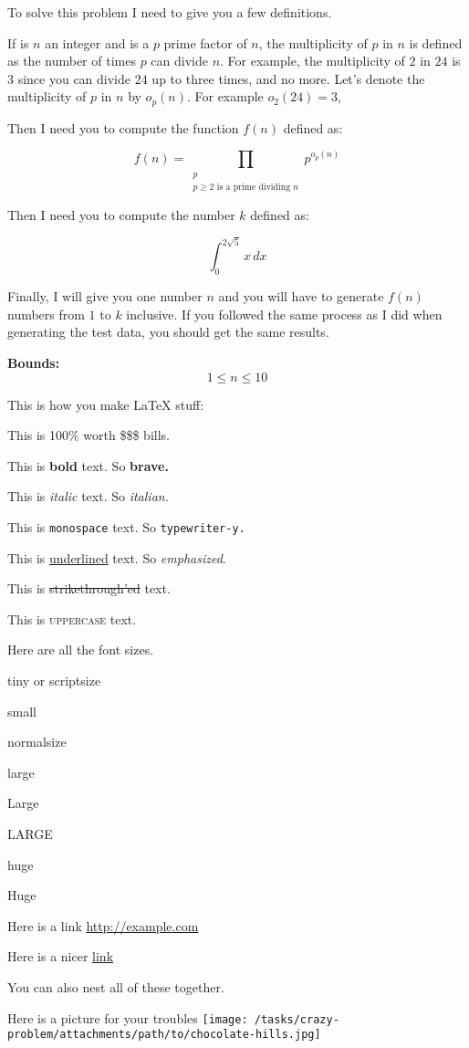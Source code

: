 To solve this problem I need to give you a few definitions.

If is \(n\) an integer and is a \(p\) prime factor of \(n\), the multiplicity of \(p\) in \(n\) is defined as the number of times \(p\) can divide \(n\). For example, the multiplicity of $2$ in $24$ is $3$ since you can divide $24$ up to three times, and no more. Let's denote the multiplicity of $p$ in $n$ by $o_p(n)$. For example \(o_2(24) = 3\), 

Then I need you to compute the function $f(n)$ defined as:

$$f(n) = \prod_{\substack{p \\ p \geq 2 \text{ is a prime dividing } n}} p^{o_p(n)}$$

Then I need you to compute the number $k$ defined as:

\[\int_{0}^{2\sqrt{5}} x \, dx\]

Finally, I will give you one number $n$ and you will have to generate $f(n)$ numbers from $1$ to $k$ inclusive. If you followed the same process as I did when generating the test data, you should get the same results.

\large{\bf{Bounds:}}
$$ 1 \le n \le 10 $$

This is how you make LaTeX stuff:

This is 100\% worth \$\$\$ bills.

This is \textbf{bold} text. So \bf{brave}.

This is \textit{italic} text. So \it{italian}.

This is \texttt{monospace} text. So \tt{typewriter-y}.

This is \underline{underlined} text. So \emph{emphasized}.

This is \sout{strikethrough'ed} text.

This is \textsc{uppercase} text.

Here are all the font sizes.

\tiny{tiny} or \scriptsize{scriptsize}

\small{small}

\normalsize{normalsize}

\large{large}

\Large{Large}

\LARGE{LARGE}

\huge{huge}

\Huge{Huge}


Here is a link \url{http://example.com}

Here is a nicer \href{http://example.com}{link}

You can also nest all of these together. \href{http://example.com}{}

Here is a picture for your troubles \texttt{[image: /tasks/crazy-problem/attachments/path/to/chocolate-hills.jpg]}
